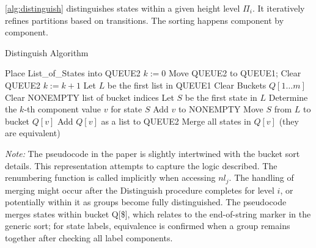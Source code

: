 \cref{alg:distinguish} distinguishes states within a given height level $\Pi_i$. It iteratively refines partitions based on transitions. The sorting happens component by component.

\begin{algorithm}[h]
    \caption{Distinguish Algorithm} \label{alg:distinguish}
    \begin{algorithmic}[1] 
        \State Place List\_of\_States into QUEUE2 
        \State $k := 0$ 
        \Repeat
            \State Move QUEUE2 to QUEUE1; Clear QUEUE2
            \State $k := k + 1$
                \State Let $L$ be the first list in QUEUE1
                \State Clear Buckets $Q[1 \dots m]$ 
                \State Clear NONEMPTY list of bucket indices
                    \State Let $S$ be the first state in $L$
                    \State Determine the $k$-th component value $v$ for state $S$
                        \State Add $v$ to NONEMPTY
                    \EndIf
                    \State Move $S$ from $L$ to bucket $Q[v]$
                \EndWhile
                        \State Add $Q[v]$ as a list to QUEUE2 
                        \State Merge all states in $Q[v]$ (they are equivalent)
                    \EndIf
                \EndFor
            \EndWhile
         
        \EndFunction
    \end{algorithmic}
\end{algorithm}

\textit{Note:} The pseudocode in the paper is slightly intertwined with the bucket sort details. This representation attempts to capture the logic described. The renumbering function is called implicitly when accessing $nl_j$. The handling of merging might occur after the Distinguish procedure completes for level $i$, or potentially within it as groups become fully distinguished. The pseudocode merges states within bucket Q[\$], which relates to the end-of-string marker in the generic sort; for state labels, equivalence is confirmed when a group remains together after checking all label components.

